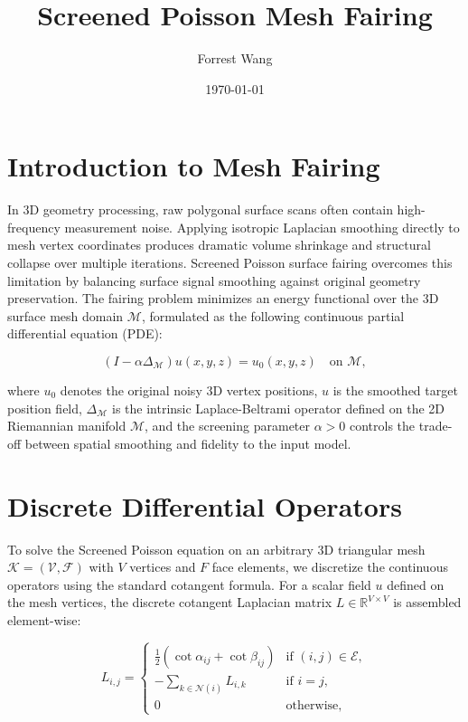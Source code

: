 \documentclass[11pt,letterpaper]{article}
\title{Screened Poisson Mesh Fairing}
\author{Forrest Wang}
\date{\today}
\begin{document}
\maketitle

\section{Introduction to Mesh Fairing}

In 3D geometry processing, raw polygonal surface scans often contain high-frequency measurement noise. Applying isotropic Laplacian smoothing directly to mesh vertex coordinates produces dramatic volume shrinkage and structural collapse over multiple iterations. Screened Poisson surface fairing overcomes this limitation by balancing surface signal smoothing against original geometry preservation. The fairing problem minimizes an energy functional over the 3D surface mesh domain $\mathcal{M}$, formulated as the following continuous partial differential equation (PDE):

\begin{equation*}
(I - \alpha \Delta_{\mathcal{M}}) u(x,y,z) = u_0(x,y,z) \quad \text{on } \mathcal{M},
\end{equation*}

\noindent where $u_0$ denotes the original noisy 3D vertex positions, $u$ is the smoothed target position field, $\Delta_{\mathcal{M}}$ is the intrinsic Laplace-Beltrami operator defined on the 2D Riemannian manifold $\mathcal{M}$, and the screening parameter $\alpha > 0$ controls the trade-off between spatial smoothing and fidelity to the input model.

\section{Discrete Differential Operators}

To solve the Screened Poisson equation on an arbitrary 3D triangular mesh $\mathcal{K} = (\mathcal{V}, \mathcal{F})$ with $V$ vertices and $F$ face elements, we discretize the continuous operators using the standard cotangent formula. For a scalar field $u$ defined on the mesh vertices, the discrete cotangent Laplacian matrix $L \in \mathbb{R}^{V \times V}$ is assembled element-wise:

\begin{equation*}
L_{i,j} = \begin{cases}
\frac{1}{2} (\cot \alpha_{ij} + \cot \beta_{ij}) & \text{if } (i, j) \in \mathcal{E}, \\[4pt]
-\sum_{k \in \mathcal{N}(i)} L_{i,k} & \text{if } i = j, \\[4pt]
0 & \text{otherwise},
\end{cases}
\end{equation*}
\end{document}
